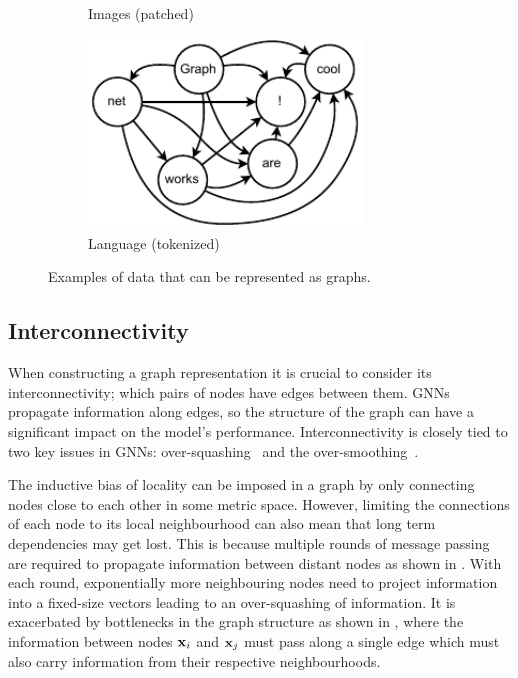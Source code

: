 \begin{figure}
\begin{subfigure}[b]{0.45\textwidth}
        \caption{Images (patched)}
        \label{fig:dog}
    \end{subfigure}
    \begin{subfigure}[b]{0.45\textwidth}
        \centering
        \includegraphics[width=0.8\textwidth]{Figures/transformers/text.pdf}
        \caption{Language (tokenized)}
        \label{fig:text}
    \end{subfigure}
    \caption{Examples of data that can be represented as graphs.}
    \label{fig:graph_examples}
\end{figure}

\subsection{Interconnectivity}

When constructing a graph representation it is crucial to consider its interconnectivity; which pairs of nodes have edges between them.
GNNs propagate information along edges, so the structure of the graph can have a significant impact on the model's performance.
Interconnectivity is closely tied to two key issues in GNNs: over-squashing~\cite{OverSquashing} and the over-smoothing~\cite{OverSmoothing}.

The inductive bias of locality can be imposed in a graph by only connecting nodes close to each other in some metric space.
However, limiting the connections of each node to its local neighbourhood can also mean that long term dependencies may get lost.
This is because multiple rounds of message passing are required to propagate information between distant nodes as shown in .
With each round, exponentially more neighbouring nodes need to project information into a fixed-size vectors leading to an over-squashing of information.
It is exacerbated by bottlenecks in the graph structure as shown in , where the information between nodes $\mathbf{x}_i$ and $\mathbf{x}_j$ must pass along a single edge which must also carry information from their respective neighbourhoods.

